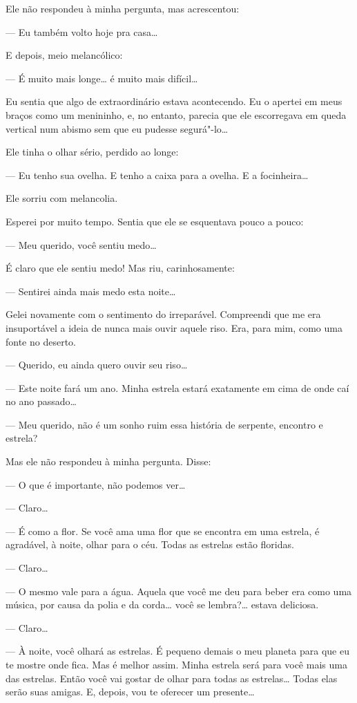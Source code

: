 \begin{Parallel}[p]{}{}
{Ele não respondeu à minha pergunta, mas acrescentou:

--- Eu também volto hoje pra casa\ldots{}

E depois, meio melancólico:

--- É muito mais longe\ldots{} é muito mais difícil\ldots{}

Eu sentia que algo de extraordinário estava acontecendo. Eu o apertei em
meus braços como um menininho, e, no entanto, parecia que ele
escorregava em queda vertical num abismo sem que eu pudesse segurá"-lo\ldots{}

Ele tinha o olhar sério, perdido ao longe:

--- Eu tenho sua ovelha. E tenho a caixa para a ovelha. E a focinheira\ldots{}

Ele sorriu com melancolia.

Esperei por muito tempo. Sentia que ele se esquentava pouco a pouco:

--- Meu querido, você sentiu medo\ldots{}

É claro que ele sentiu medo! Mas riu, carinhosamente:

--- Sentirei ainda mais medo esta noite\ldots{}

Gelei novamente com o sentimento do irreparável. Compreendi que me era
insuportável a ideia de nunca mais ouvir aquele riso. Era, para mim,
como uma fonte no deserto.

--- Querido, eu ainda quero ouvir seu riso\ldots{}

--- Este noite fará um ano. Minha estrela estará exatamente em cima de
onde caí no ano passado\ldots{}

--- Meu querido, não é um sonho ruim essa história de serpente, encontro e
estrela?

Mas ele não respondeu à minha pergunta. Disse:

--- O que é importante, não podemos ver\ldots{}

--- Claro\ldots{}

--- É como a flor. Se você ama uma flor que se encontra em uma estrela, é
agradável, à noite, olhar para o céu. Todas as estrelas estão floridas.

--- Claro\ldots{}

--- O mesmo vale para a água. Aquela que você me deu para beber era como
uma música, por causa da polia e da corda\ldots{} você se lembra?\ldots{} estava
deliciosa.

--- Claro\ldots{}

--- À noite, você olhará as estrelas. É pequeno demais o meu planeta para
que eu te mostre onde fica. Mas é melhor assim. Minha estrela será para
você mais uma das estrelas. Então você vai gostar de olhar para todas as
estrelas\ldots{} Todas elas serão suas amigas. E, depois, vou te oferecer um
presente\ldots{}

}
\end{Parallel}
